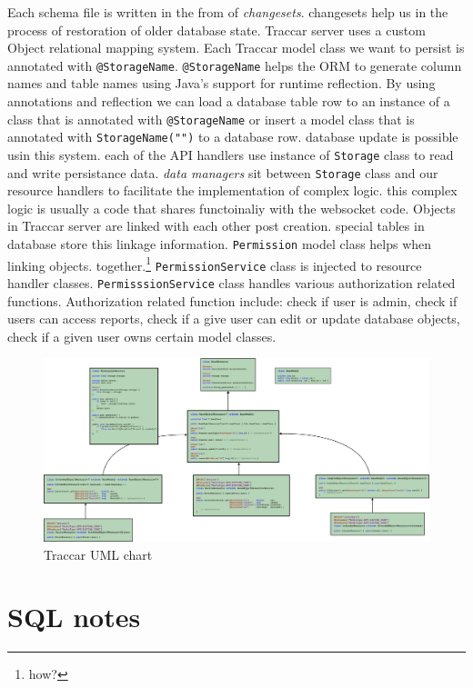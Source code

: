 \documentclass[a4paper]{article}
\begin{document}
Each schema file is written in the from of \emph{changesets}. changesets help us in the process of restoration of older 
database state. Traccar server uses a custom Object relational mapping system. Each Traccar model class we want to persist
is annotated with \lstinline{@StorageName}. \lstinline{@StorageName} helps the ORM to generate column names and table names 
using Java's support for runtime reflection. By using annotations and reflection we can load a database table row to an 
instance of a class that is annotated with \lstinline{@StorageName} or insert a model class that is annotated with 
\lstinline{StorageName("")} to a database row. database update is possible usin this system. each of the API handlers use 
instance of  \lstinline{Storage} class to read and write persistance data. \emph{data managers} sit between \lstinline{Storage}
class and our resource handlers to facilitate the implementation of complex logic. this complex logic is usually a code that
shares functoinaliy with the websocket code. Objects in Traccar server are linked with each other post creation. special 
tables in database store this linkage information. \lstinline{Permission} model class helps when linking objects. together.\footnote{how?}
\lstinline{PermissionService} class is injected to resource handler classes. \lstinline{PermisssionService} class handles
various authorization related functions. Authorization related function include: check if user is admin, check if users can
access reports, check if a give user can edit or update database objects, check if a given user owns certain model classes.


\begin{figure}
    \centering
    \includegraphics[width=\textheight]{graphics/uml-chart.png}
    \caption{Traccar UML chart}
\end{figure}

\section*{SQL notes}
\end{document}
